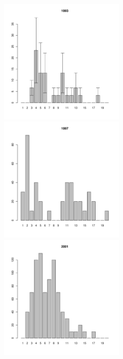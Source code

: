 \begin{figure}[h]
\begin{multicols}{3}
\hfill
\includegraphics[width=60mm]{../White_Sea/Luvenga_Goreliy/low_1993_.pdf}
\hfill
\includegraphics[width=60mm]{../White_Sea/Luvenga_Goreliy/low_1997_.pdf}
\hfill
\includegraphics[width=60mm]{../White_Sea/Luvenga_Goreliy/low_2001_.pdf}
\end{multicols}



\end{figure}
